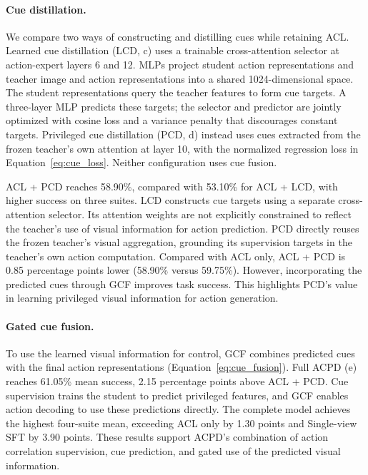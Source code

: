 \documentclass{ELSP}
\begin{document}
\paragraph{Cue distillation.}
We compare two ways of constructing and distilling cues while
retaining ACL. Learned cue distillation (LCD, c) uses a trainable
cross-attention selector at action-expert layers 6 and 12.
MLPs project student action representations and teacher image
and action representations into a shared 1024-dimensional space.
The student representations query the teacher features to form
cue targets. A three-layer MLP predicts these targets; the
selector and predictor are jointly optimized with cosine loss
and a variance penalty that discourages constant targets.
Privileged cue distillation (PCD, d) instead uses cues extracted
from the frozen teacher's own attention at layer 10, with the
normalized regression loss in Equation~\eqref{eq:cue_loss}.
Neither configuration uses cue fusion.

ACL + PCD reaches 58.90\%, compared with 53.10\% for ACL + LCD,
with higher success on three suites.
LCD constructs cue targets using a separate cross-attention
selector. Its attention weights are not explicitly constrained
to reflect the teacher's use of visual information for action
prediction. PCD directly reuses the frozen teacher's visual
aggregation, grounding its supervision targets in the teacher's
own action computation.
Compared with ACL only, ACL + PCD is 0.85 percentage points
lower (58.90\% versus 59.75\%). However, incorporating the
predicted cues through GCF improves task success. This highlights
PCD's value in learning privileged visual information for
action generation.

\paragraph{Gated cue fusion.}
To use the learned visual information for control, GCF combines
predicted cues with the final action representations
(Equation~\eqref{eq:cue_fusion}).
Full ACPD (e) reaches 61.05\% mean success, 2.15 percentage points above
ACL + PCD. Cue supervision trains the
student to predict privileged features, and GCF enables action
decoding to use these predictions directly.
The complete model achieves the highest four-suite mean,
exceeding ACL only by 1.30 points and Single-view SFT by
3.90 points. These results support ACPD's combination of
action correlation supervision, cue prediction, and gated
use of the predicted visual information.
\end{document}
